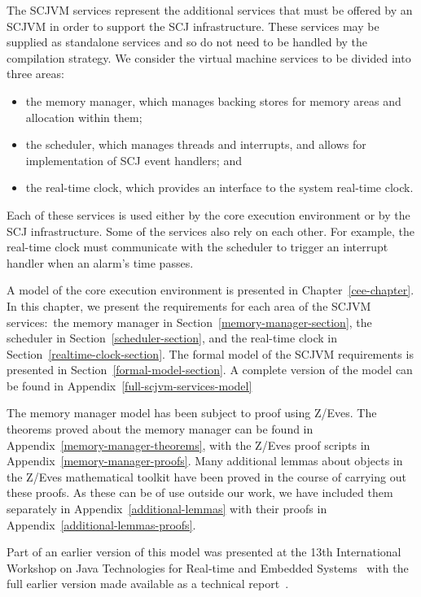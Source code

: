 The SCJVM services represent the additional services that must be
offered by an SCJVM in order to support the SCJ infrastructure.
These services may be supplied as standalone services and so do not
need to be handled by the compilation strategy.
We consider the virtual machine services to be divided into three
areas:
\begin{itemize}
\item the memory manager, which manages backing stores for memory areas and
  allocation within them;
\item the scheduler, which manages threads and interrupts, and allows for
  implementation of SCJ event handlers; and
\item the real-time clock, which provides an interface to the system real-time
  clock.
\end{itemize}
Each of these services is used either by the core execution
environment or by the SCJ infrastructure.
Some of the services also rely on each other. 
For example, the real-time clock must communicate with the scheduler
to trigger an interrupt handler when an alarm's time passes.

A model of the core execution environment is presented in
Chapter~\ref{cee-chapter}.
In this chapter, we present the requirements for each area of the
SCJVM services:~the memory manager in
Section~\ref{memory-manager-section}, the scheduler in
Section~\ref{scheduler-section}, and the real-time clock in
Section~\ref{realtime-clock-section}.
The formal model of the SCJVM requirements is presented in
Section~\ref{formal-model-section}.
A complete version of the model can be found in
Appendix~\ref{full-scjvm-services-model}

The memory manager model has been subject to proof using Z/Eves.
The theorems proved about the memory manager can be found in
Appendix~\ref{memory-manager-theorems}, with the Z/Eves proof scripts
in Appendix~\ref{memory-manager-proofs}.
Many additional lemmas about objects in the Z/Eves mathematical
toolkit have been proved in the course of carrying out these proofs.
As these can be of use outside our work, we have included them
separately in Appendix~\ref{additional-lemmas} with their proofs in
Appendix~\ref{additional-lemmas-proofs}.

Part of an earlier version of this model was presented at the 13th
International Workshop on Java Technologies for Real-time and Embedded
Systems~\cite{baxter2015a} with the full earlier version made available
as a technical report~\cite{baxter2015}.

